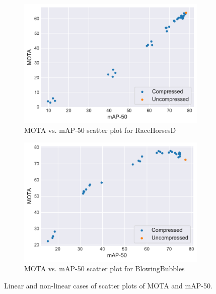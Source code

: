 \begin{figure}[!tb]
  \centering
  \begin{subfigure}[b]{.5\textwidth}
    \includegraphics[width=\textwidth]{img/MOTA_vs_mAP50_RaceHorsesD.pdf}
    \caption{MOTA vs. mAP-50 scatter plot for RaceHorsesD}
    \label{fig:MOTA_vs_mAP50_RaceHorsesD}
  \end{subfigure}%
  \begin{subfigure}[b]{.5\textwidth}
    \includegraphics[width=\textwidth]{img/MOTA_vs_mAP50_BlowingBubbles.pdf}
    \caption{MOTA vs. mAP-50 scatter plot for BlowingBubbles}
    \label{fig:MOTA_vs_mAP50_BlowingBubbles}
  \end{subfigure}
  \caption[Linear and non-linear cases of scatter plots of MOTA and mAP-50]{%
    Linear and non-linear cases of scatter plots of MOTA and mAP-50.%
  }
  \label{fig:MOTA_vs_mAP50_example}
\end{figure}